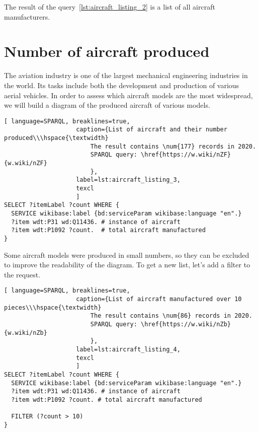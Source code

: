 The result of the query~\ref{lst:aircraft_listing_2} is a list of all aircraft manufacturers.


\section{Number of aircraft produced}

The aviation industry is one of the largest mechanical engineering industries in the world. Its tasks include both the development 
and production of various aerial vehicles. In order to assess which aircraft models are the most widespread, we will build a diagram 
of the produced aircraft of various models.

\begin{lstlisting}[ language=SPARQL, breaklines=true, 
                    caption={List of aircraft and their number produced\\\hspace{\textwidth}
                        The result contains \num{177} records in 2020. 
                        SPARQL query: \href{https://w.wiki/nZF}{w.wiki/nZF}
                        },
                    label=lst:aircraft_listing_3,
                    texcl 
                    ]
SELECT ?itemLabel ?count WHERE {
  SERVICE wikibase:label {bd:serviceParam wikibase:language "en".}
  ?item wdt:P31 wd:Q11436. # instance of aircraft
  ?item wdt:P1092 ?count.  # total aircraft manufactured
}
\end{lstlisting}

Some aircraft models were produced in small numbers, so they can be excluded to improve the readability of the diagram. 
To get a new list, let's add a filter to the request.

\begin{lstlisting}[ language=SPARQL, breaklines=true, 
                    caption={List of aircraft manufactured over 10 pieces\\\hspace{\textwidth}
                        The result contains \num{86} records in 2020.
                        SPARQL query: \href{https://w.wiki/nZb}{w.wiki/nZb}
                        },
                    label=lst:aircraft_listing_4,
                    texcl 
                    ]
SELECT ?itemLabel ?count WHERE {
  SERVICE wikibase:label {bd:serviceParam wikibase:language "en".}
  ?item wdt:P31 wd:Q11436. # instance of aircraft
  ?item wdt:P1092 ?count. # total aircraft manufactured
  
  FILTER (?count > 10)
}
\end{lstlisting}

